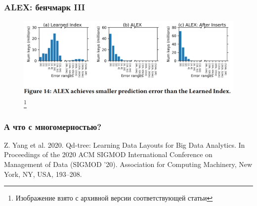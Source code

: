 \documentclass{beamer}
\begin{document}
\begin{frame}
	\frametitle{ALEX: бенчмарк III}
	\begin{figure}[htb]
		\includegraphics[width=\textwidth,height=0.8\textheight,keepaspectratio]{alex-bench-3.png} 
		\footnote{\tiny{Изображение взято с архивной версии соответствующей статьи}}
	\end{figure}	
	

\end{frame}



\begin{frame}
	\frametitle{А что с многомерностью?}


Z. Yang et al. 2020. Qd-tree: Learning Data Layouts for Big Data Analytics. In Proceedings of the 2020 ACM SIGMOD International Conference on Management of Data (SIGMOD '20). Association for Computing Machinery, New York, NY, USA, 193–208. 


\end{frame}

\end{document}

